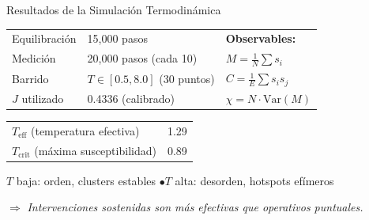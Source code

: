 \documentclass[11pt]{beamer}
\begin{document}
\begin{frame}{Resultados de la Simulación Termodinámica}

\begin{center}
\begin{tabular}{lll}
Equilibración & 15,000 pasos & \hspace{1cm} \textbf{Observables:} \\
Medición & 20,000 pasos (cada 10) & $M = \frac{1}{N}\sum s_i$ \\
Barrido & $T \in [0.5, 8.0]$ (30 puntos) & $C = \frac{1}{E}\sum s_i s_j$ \\
$J$ utilizado & 0.4336 (calibrado) & $\chi = N \cdot \text{Var}(M)$
\end{tabular}
\end{center}

\vspace{0.3cm}
\begin{center}
\begin{tabular}{ll}
$T_{\text{eff}}$ (temperatura efectiva) & \alert{1.29} \\
$T_{\text{crit}}$ (máxima susceptibilidad) & 0.89
\end{tabular}
\end{center}

\vspace{0.2cm}
\begin{center}
\end{center}

\vspace{0.15cm}
\begin{center}
\small $T$ baja: orden, clusters estables \quad$\bullet$\quad $T$ alta: desorden, hotspots efímeros

$\Rightarrow$ \textit{Intervenciones sostenidas son más efectivas que operativos puntuales.}
\end{center}
\end{frame}
\end{document}
